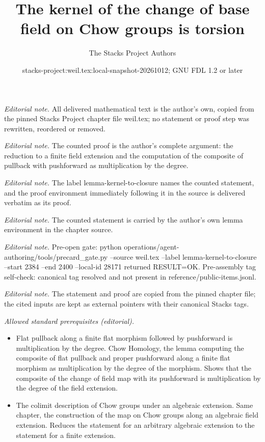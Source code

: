 \documentclass[10pt,a4paper]{amsart}
\title{The kernel of the change of base field on Chow groups is torsion}
\author{The Stacks Project Authors}
\date{stacks-project:weil.tex:local-snapshot-20261012; GNU FDL 1.2 or later}
\theoremstyle{plain}
\theoremstyle{definition}
\theoremstyle{remark}
\numberwithin{equation}{subsection}
\begin{document}
\maketitle
\noindent\textit{Editorial note.} All delivered mathematical text is the author's own, copied from the pinned Stacks Project chapter file weil.tex; no statement or proof step was rewritten, reordered or removed.\par\medskip
\noindent\textit{Editorial note.} The counted proof is the author's complete argument: the reduction to a finite field extension and the computation of the composite of pullback with pushforward as multiplication by the degree.\par\medskip
\noindent\textit{Editorial note.} The label lemma-kernel-to-closure names the counted statement, and the proof environment immediately following it in the source is delivered verbatim as its proof.\par\medskip
\noindent\textit{Editorial note.} The counted statement is carried by the author's own lemma environment in the chapter source.\par\medskip
\noindent\textit{Editorial note.} Pre-open gate: python operations/agent-authoring/tools/precard\_gate.py --source weil.tex --label lemma-kernel-to-closure --start 2384 --end 2400 --local-id 28171 returned RESULT=OK. Pre-assembly tag self-check: canonical tag resolved and not present in reference/public-items.jsonl.\par\medskip
\noindent\textit{Editorial note.} The statement and proof are copied from the pinned chapter file; the cited inputs are kept as external pointers with their canonical Stacks tags.\par\medskip
\noindent\textit{Allowed standard prerequisites (editorial).}\begin{itemize}
\item Flat pullback along a finite flat morphism followed by pushforward is multiplication by the degree. Chow Homology, the lemma computing the composite of flat pullback and proper pushforward along a finite flat morphism as multiplication by the degree of the morphism. Shows that the composite of the change of field map with its pushforward is multiplication by the degree of the field extension.
\item The colimit description of Chow groups under an algebraic extension. Same chapter, the construction of the map on Chow groups along an algebraic field extension. Reduces the statement for an arbitrary algebraic extension to the statement for a finite extension.
\end{itemize}\medskip
\end{document}
